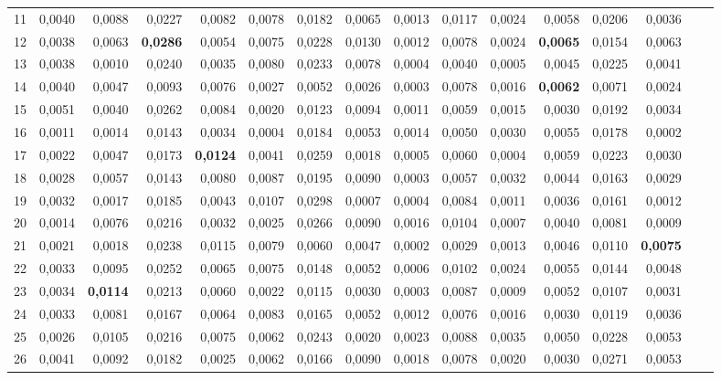 \begin{table}[htp!]
\begin{adjustwidth}{-1cm}{}
\begin{tabular}{ l | *{15}{| r}}
11	&	0,0040	&	0,0088	&	0,0227	&	0,0082	&	0,0078	&	0,0182	&	0,0065	&	0,0013	&	0,0117	&	0,0024	&	0,0058	&	0,0206	&	0,0036	\\
12	&	0,0038	&	0,0063	&	\textbf{0,0286}	&	0,0054	&	0,0075	&	0,0228	&	0,0130	&	0,0012	&	0,0078	&	0,0024	&	\textbf{0,0065}	&	0,0154	&	0,0063	\\
13	&	0,0038	&	0,0010	&	0,0240	&	0,0035	&	0,0080	&	0,0233	&	0,0078	&	0,0004	&	0,0040	&	0,0005	&	0,0045	&	0,0225	&	0,0041	\\
14	&	0,0040	&	0,0047	&	0,0093	&	0,0076	&	0,0027	&	0,0052	&	0,0026	&	0,0003	&	0,0078	&	0,0016	&	\textbf{0,0062}	&	0,0071	&	0,0024	\\
15	&	0,0051	&	0,0040	&	0,0262	&	0,0084	&	0,0020	&	0,0123	&	0,0094	&	0,0011	&	0,0059	&	0,0015	&	0,0030	&	0,0192	&	0,0034	\\
16	&	0,0011	&	0,0014	&	0,0143	&	0,0034	&	0,0004	&	0,0184	&	0,0053	&	0,0014	&	0,0050	&	0,0030	&	0,0055	&	0,0178	&	0,0002	\\
17	&	0,0022	&	0,0047	&	0,0173	&	\textbf{0,0124}	&	0,0041	&	0,0259	&	0,0018	&	0,0005	&	0,0060	&	0,0004	&	0,0059	&	0,0223	&	0,0030	\\
18	&	0,0028	&	0,0057	&	0,0143	&	0,0080	&	0,0087	&	0,0195	&	0,0090	&	0,0003	&	0,0057	&	0,0032	&	0,0044	&	0,0163	&	0,0029	\\
19	&	0,0032	&	0,0017	&	0,0185	&	0,0043	&	0,0107	&	0,0298	&	0,0007	&	0,0004	&	0,0084	&	0,0011	&	0,0036	&	0,0161	&	0,0012	\\
20	&	0,0014	&	0,0076	&	0,0216	&	0,0032	&	0,0025	&	0,0266	&	0,0090	&	0,0016	&	0,0104	&	0,0007	&	0,0040	&	0,0081	&	0,0009	\\
21	&	0,0021	&	0,0018	&	0,0238	&	0,0115	&	0,0079	&	0,0060	&	0,0047	&	0,0002	&	0,0029	&	0,0013	&	0,0046	&	0,0110	&	\textbf{0,0075}	\\
22	&	0,0033	&	0,0095	&	0,0252	&	0,0065	&	0,0075	&	0,0148	&	0,0052	&	0,0006	&	0,0102	&	0,0024	&	0,0055	&	0,0144	&	0,0048	\\
23	&	0,0034	&	\textbf{0,0114}	&	0,0213	&	0,0060	&	0,0022	&	0,0115	&	0,0030	&	0,0003	&	0,0087	&	0,0009	&	0,0052	&	0,0107	&	0,0031	\\
24	&	0,0033	&	0,0081	&	0,0167	&	0,0064	&	0,0083	&	0,0165	&	0,0052	&	0,0012	&	0,0076	&	0,0016	&	0,0030	&	0,0119	&	0,0036	\\
25	&	0,0026	&	0,0105	&	0,0216	&	0,0075	&	0,0062	&	0,0243	&	0,0020	&	0,0023	&	0,0088	&	0,0035	&	0,0050	&	0,0228	&	0,0053	\\
26	&	0,0041	&	0,0092	&	0,0182	&	0,0025	&	0,0062	&	0,0166	&	0,0090	&	0,0018	&	0,0078	&	0,0020	&	0,0030	&	0,0271	&	0,0053	\\

\end{tabular}
\end{adjustwidth}
\end{table}
